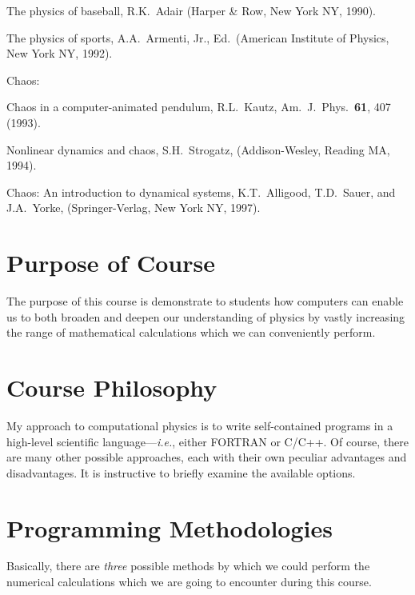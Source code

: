 \begin{description}
\begin{description}
\item {\sf The physics of baseball}, R.K.~Adair (Harper \& Row, New York NY, 1990).
\item {\sf The physics of sports}, A.A.~Armenti, Jr., Ed.\ (American Institute of Physics, New York
NY, 1992).
\end{description}
\item {\sc Chaos:}
\begin{description}
\item {\sf Chaos in a computer-animated pendulum}, R.L.~Kautz, Am.\ J.\ Phys.\ {\bf 61}, 407 (1993).
\item {\sf Nonlinear dynamics and chaos}, S.H.~Strogatz, (Addison-Wesley, Reading MA, 1994).
\item {\sf Chaos: An introduction to dynamical systems}, K.T.~Alligood, T.D.~Sauer, and J.A.~Yorke,
(Springer-Verlag, New York NY, 1997).
\end{description}
\end{description}

\section{Purpose of Course}
The purpose of this course is demonstrate to students how computers can enable us
to both broaden and deepen our understanding of physics by vastly increasing the range of
mathematical calculations which we can conveniently perform. 

\section{Course Philosophy}
My approach to computational physics is to write self-contained programs in a high-level
scientific language---{\em i.e.}, either FORTRAN or C/C++. Of course,
there are many other possible approaches, each with their own peculiar advantages and
disadvantages. It is  instructive to  briefly examine the available options. 

\section{Programming Methodologies}
Basically, there are {\em three}\/ possible methods by which we could perform the numerical calculations 
which we are going to encounter during this course. 

